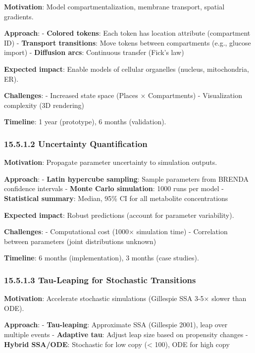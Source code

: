 \textbf{Motivation}: Model compartmentalization, membrane transport,
spatial gradients.

\textbf{Approach}: - \textbf{Colored tokens}: Each token has location
attribute (compartment ID) - \textbf{Transport transitions}: Move tokens
between compartments (e.g., glucose import) - \textbf{Diffusion arcs}:
Continuous transfer (Fick's law)

\textbf{Expected impact}: Enable models of cellular organelles (nucleus,
mitochondria, ER).

\textbf{Challenges}: - Increased state space (\textbar Places\textbar{}
× \textbar Compartments\textbar) - Visualization complexity (3D
rendering)

\textbf{Timeline}: 1 year (prototype), 6 months (validation).

\hypertarget{uncertainty-quantification}{%
\subsubsection{15.5.1.2 Uncertainty
Quantification}\label{uncertainty-quantification}}

\textbf{Motivation}: Propagate parameter uncertainty to simulation
outputs.

\textbf{Approach}: - \textbf{Latin hypercube sampling}: Sample
parameters from BRENDA confidence intervals - \textbf{Monte Carlo
simulation}: 1000 runs per model - \textbf{Statistical summary}: Median,
95\% CI for all metabolite concentrations

\textbf{Expected impact}: Robust predictions (account for parameter
variability).

\textbf{Challenges}: - Computational cost (1000× simulation time) -
Correlation between parameters (joint distributions unknown)

\textbf{Timeline}: 6 months (implementation), 3 months (case studies).

\hypertarget{tau-leaping-for-stochastic-transitions}{%
\subsubsection{15.5.1.3 Tau-Leaping for Stochastic
Transitions}\label{tau-leaping-for-stochastic-transitions}}

\textbf{Motivation}: Accelerate stochastic simulations (Gillespie SSA
3-5× slower than ODE).

\textbf{Approach}: - \textbf{Tau-leaping}: Approximate SSA (Gillespie
2001), leap over multiple events - \textbf{Adaptive tau}: Adjust leap
size based on propensity changes - \textbf{Hybrid SSA/ODE}: Stochastic
for low copy (\textless{} 100), ODE for high copy

